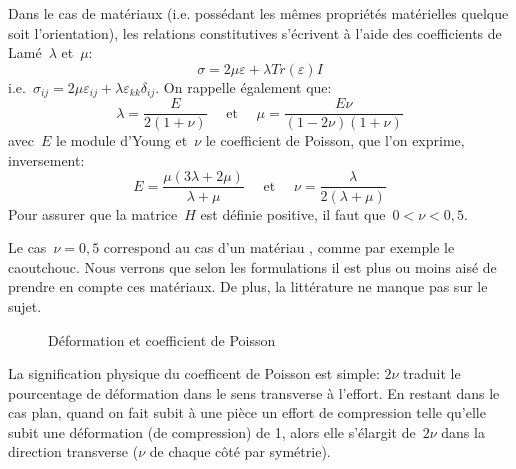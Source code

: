 \medskip
Dans le cas de matériaux  (i.e. possédant les mêmes
propriétés matérielles quelque soit l'orientation), les relations constitutives s'écrivent
à l'aide des coefficients de Lamé~$\lambda$ et~$\mu$:
\begin{equation}\sigma = 2\mu\varepsilon+\lambda Tr(\varepsilon)I\end{equation}
i.e.~$\sigma_{ij}=2\mu\varepsilon_{ij}+\lambda\varepsilon_{kk}\delta_{ij}$.
On rappelle également que:
\begin{equation}\lambda=\dfrac{E}{2(1+\nu)} \quad \text{ et } \quad \mu=\dfrac{E\nu}{(1-2\nu)(1+\nu)}
\end{equation}
avec~$E$ le module d'Young et~$\nu$ le coefficient de Poisson, que l'on exprime, inversement:
\begin{equation}
E=\dfrac{\mu(3\lambda+2\mu)}{\lambda+\mu} \quad\text{ et }\quad
\nu=\dfrac{\lambda}{2(\lambda+\mu)}
\end{equation}
Pour assurer que la matrice~$H$ est définie positive, il faut que~$0<\nu<0,5$.

\medskip
Le cas~$\nu=0,5$ correspond au cas d'un matériau , comme par
exemple le caoutchouc.
Nous verrons que selon les formulations il est plus ou moins aisé de prendre en compte
ces matériaux. De plus, la littérature ne manque pas sur le sujet.

\medskip
\begin{wrapfigure}{l}{60mm}
  \centering
   \hfill
  \caption{Déformation et coefficient de Poisson}
\end{wrapfigure}
La signification physique du coefficent de Poisson est simple:
$2\nu$ traduit le pourcentage de déformation dans le sens transverse
à l'effort. En restant dans le cas plan, quand on fait subit à une pièce un effort de 
compression telle qu'elle subit une déformation (de compression) de 1, alors elle 
s'élargit de~$2\nu$ dans la direction transverse ($\nu$ de chaque côté par symétrie).

